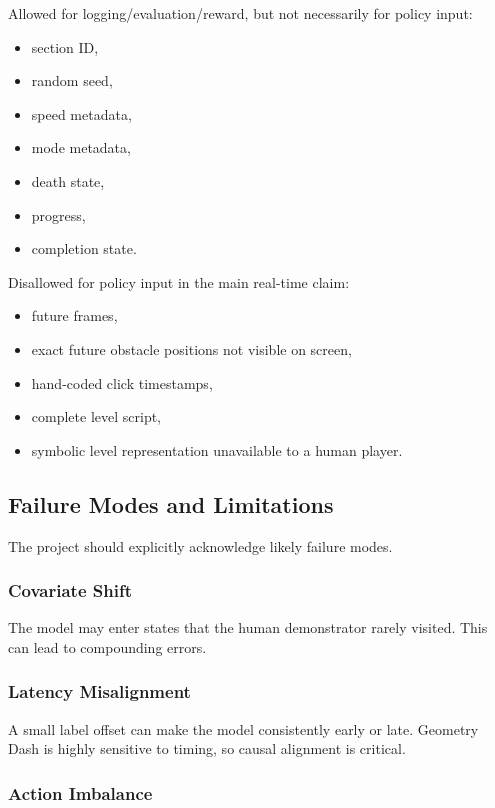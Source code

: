 \documentclass[11pt]{article}
\begin{document}
Allowed for logging/evaluation/reward, but not necessarily for policy input:
\begin{itemize}
  \item section ID,
  \item random seed,
  \item speed metadata,
  \item mode metadata,
  \item death state,
  \item progress,
  \item completion state.
\end{itemize}

Disallowed for policy input in the main real-time claim:
\begin{itemize}
  \item future frames,
  \item exact future obstacle positions not visible on screen,
  \item hand-coded click timestamps,
  \item complete level script,
  \item symbolic level representation unavailable to a human player.
\end{itemize}

\subsection{Failure Modes and Limitations}

The project should explicitly acknowledge likely failure modes.

\subsubsection{Covariate Shift}

The model may enter states that the human demonstrator rarely visited. This can lead to compounding errors.

\subsubsection{Latency Misalignment}

A small label offset can make the model consistently early or late. Geometry Dash is highly sensitive to timing, so causal alignment is critical.

\subsubsection{Action Imbalance}
\end{document}
